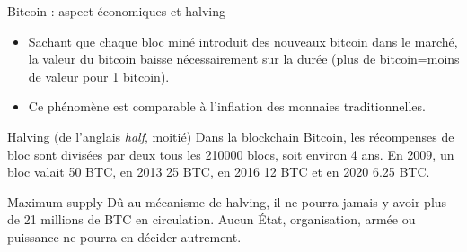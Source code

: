 \begin{frame}{Bitcoin : aspect économiques et halving}
  \begin{itemize}
    \item Sachant que chaque bloc miné introduit des nouveaux bitcoin dans le marché, la valeur du bitcoin baisse nécessairement sur la durée (plus de bitcoin=moins de valeur pour 1 bitcoin).
    \item Ce phénomène est comparable à l'inflation des monnaies traditionnelles.
  \end{itemize}

  \begin{block}{Halving (de l'anglais \textit{half}, moitié)}
    Dans la blockchain Bitcoin, les récompenses de bloc sont divisées par deux tous les 210000 blocs, soit environ 4 ans.
    En 2009, un bloc valait 50 BTC, en 2013 25 BTC, en 2016 12 BTC et en 2020 6.25 BTC.
  \end{block}

  \begin{block}{Maximum supply}
    Dû au mécanisme de halving, il ne pourra jamais y avoir plus de 21 millions de BTC en circulation.
    Aucun État, organisation, armée ou puissance ne pourra en décider autrement.
  \end{block}
\end{frame}

